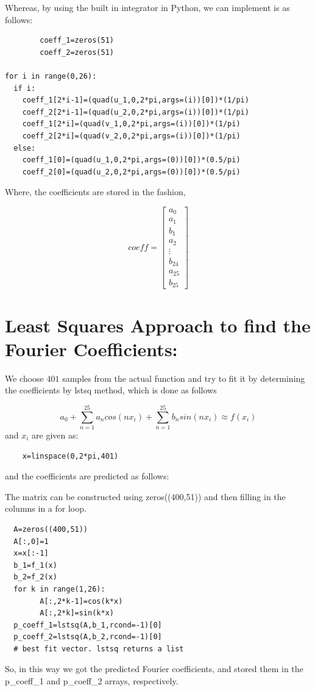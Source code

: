 \documentclass[10pt,english, openany]{book}
\begin{document}
        Whereas, by using the built in integrator in Python, we can implement is as follows:\par
        \begin{verbatim}
        coeff_1=zeros(51)
        coeff_2=zeros(51)

for i in range(0,26):
  if i:
    coeff_1[2*i-1]=(quad(u_1,0,2*pi,args=(i))[0])*(1/pi)
    coeff_2[2*i-1]=(quad(u_2,0,2*pi,args=(i))[0])*(1/pi)
    coeff_1[2*i]=(quad(v_1,0,2*pi,args=(i))[0])*(1/pi)
    coeff_2[2*i]=(quad(v_2,0,2*pi,args=(i))[0])*(1/pi)
  else:
    coeff_1[0]=(quad(u_1,0,2*pi,args=(0))[0])*(0.5/pi)
    coeff_2[0]=(quad(u_2,0,2*pi,args=(0))[0])*(0.5/pi)
        \end{verbatim}
        Where, the coefficients are stored in the fashion,\par
        \begin{equation}
coeff=\begin{bmatrix} 
	a_0\\
    a_1\\
    b_1\\
    a_2\\
    \vdots\\
     b_{24}\\a_{25}\\b_{25} 
     \end{bmatrix}
    \end{equation}
        
\section{Least Squares Approach to find the Fourier Coefficients:}
We choose $401$ samples from the actual function and try to fit it by determining the coefficients by lstsq method, which is done as follows\par

$$ a_0+\sum_{n=1}^{25} a_ncos(nx_i) +\sum_{n=1}^{25} b_nsin(nx_i) \approx f(x_i) $$
and $x_i$ are given as:
\begin{verbatim}
    x=linspace(0,2*pi,401)
    \end{verbatim}
    and the coefficients are predicted as follows:\par
    The matrix can be constructed using zeros((400,51)) and then filling in the columns in a for loop.\par
    \begin{verbatim}
  A=zeros((400,51))
  A[:,0]=1
  x=x[:-1]
  b_1=f_1(x)
  b_2=f_2(x)
  for k in range(1,26):
        A[:,2*k-1]=cos(k*x)
        A[:,2*k]=sin(k*x)
  p_coeff_1=lstsq(A,b_1,rcond=-1)[0]
  p_coeff_2=lstsq(A,b_2,rcond=-1)[0]
  # best fit vector. lstsq returns a list
    \end{verbatim}\par
    So, in this way we got the predicted Fourier coefficients, and stored them in the p\_coeff\_1 and p\_coeff\_2 arrays, respectively.
    
\end{document}
